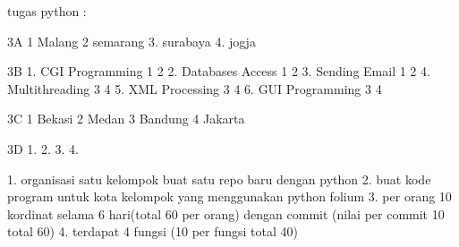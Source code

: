 tugas python :

3A
1 Malang
2 semarang
3. surabaya
4. jogja

3B 
1. CGI Programming 1 2
2. Databases Access 1 2 
3. Sending Email 1 2
4. Multithreading 3 4
5. XML Processing 3 4
6. GUI Programming 3 4

3C
1 Bekasi
2 Medan
3 Bandung
4 Jakarta



3D
1. 
2. 
3. 
4. 




1. organisasi satu kelompok buat satu repo baru dengan python
2. buat kode program untuk kota kelompok yang menggunakan python folium
3. per orang 10 kordinat selama 6 hari(total 60 per orang) dengan commit (nilai per commit 10 total 60)
4. terdapat 4 fungsi (10 per fungsi total 40)

